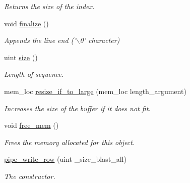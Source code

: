 \begin{DoxyCompactItemize}
\begin{DoxyCompactList}\small\item\em Returns the size of the index. \end{DoxyCompactList}\item 
\hypertarget{classpipe__write__row_a42cda52276d0371150a9dcfbf6337c42}{
void \hyperlink{classpipe__write__row_a42cda52276d0371150a9dcfbf6337c42}{finalize} ()}
\label{classpipe__write__row_a42cda52276d0371150a9dcfbf6337c42}

\begin{DoxyCompactList}\small\item\em Appends the line end ('$\backslash$0' character) \end{DoxyCompactList}\item 
\hypertarget{classpipe__write__row_ad37dbbd137467cd9a92bf435ac908f43}{
uint \hyperlink{classpipe__write__row_ad37dbbd137467cd9a92bf435ac908f43}{size} ()}
\label{classpipe__write__row_ad37dbbd137467cd9a92bf435ac908f43}

\begin{DoxyCompactList}\small\item\em Length of sequence. \end{DoxyCompactList}\item 
mem\_\-loc \hyperlink{classpipe__write__row_ac35b5611b8e351782651b39469ecaa42}{resize\_\-if\_\-to\_\-large} (mem\_\-loc length\_\-argument)
\begin{DoxyCompactList}\small\item\em Increases the size of the buffer if it does not fit. \end{DoxyCompactList}\item 
\hypertarget{classpipe__write__row_a38188c3d16b797d7ab14445a218a5184}{
void \hyperlink{classpipe__write__row_a38188c3d16b797d7ab14445a218a5184}{free\_\-mem} ()}
\label{classpipe__write__row_a38188c3d16b797d7ab14445a218a5184}

\begin{DoxyCompactList}\small\item\em Frees the memory allocated for this object. \end{DoxyCompactList}\item 
\hypertarget{classpipe__write__row_a17c4ebdd3521ab15c74b7ae659ae28ec}{
\hyperlink{classpipe__write__row_a17c4ebdd3521ab15c74b7ae659ae28ec}{pipe\_\-write\_\-row} (uint \_\-size\_\-blast\_\-all)}
\label{classpipe__write__row_a17c4ebdd3521ab15c74b7ae659ae28ec}

\begin{DoxyCompactList}\small\item\em The constructor. \end{DoxyCompactList}\end{DoxyCompactItemize}
